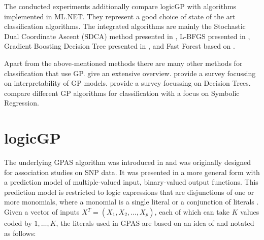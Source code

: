 \documentclass[dvipsnames,format=sigconf,anonymous=false,review=false]{acmart}
\begin{document}

The conducted experiments additionally compare logicGP with algorithms implemented in ML.NET. They represent a good choice of state of the art classification algorithms. The integrated algorithms are mainly the Stochastic Dual Coordinate Ascent (SDCA) method presented in \citet{10.1145/2086737.2086743,10.5555/2567709.2502598}, L-BFGS  presented in \citet{liu_limited_1989}, Gradient Boosting Decision Tree presented in \citet{10.5555/3294996.3295074}, and Fast Forest based on \citet{JMLR:v7:meinshausen06a}. %


Apart from the above-mentioned methods there are many other methods for classification that use GP. \citet{5340522} give an extensive overview. \citet{9965435} provide a survey focussing on interpretability of GP models. \citet{RIVERALOPEZ2022101006} provide a survey focussing on Decision Trees. \citet{Korns2019,10.1145/3520304.3528922} compare different GP algorithms for classification with a focus on Symbolic Regression. 


\section{logicGP}\label{sec:logicgp}

The underlying GPAS algorithm was introduced in \citet{10.1093/bioinformatics/btm522} and was originally designed for association studies on SNP data. It was presented in a more general form with a prediction model of multiple-valued input, binary-valued output functions. This prediction model is restricted to logic expressions that are disjunctions of one or more monomials, where a monomial is a single literal or a conjunction of literals \citep[see e.g.\ ][]{10.5555/1625135.1625242}. Given a vector of inputs $X^T=(X_1,X_2,\ldots,X_p)$, each of which can take $K$ values coded by $1, \ldots, K$, the literals used in GPAS are based on an idea of \citet{DussaultMetzeEtAl1976} and notated as follows: 
\end{document}
